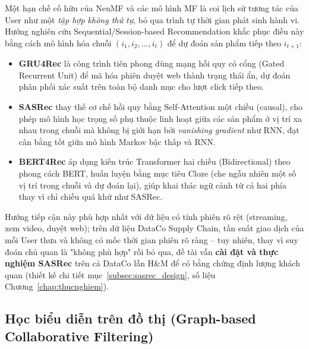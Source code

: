 Một hạn chế cố hữu của NeuMF và các mô hình MF là coi lịch sử tương tác của User như một \emph{tập hợp không thứ tự}, bỏ qua trình tự thời gian phát sinh hành vi. Hướng nghiên cứu Sequential/Session-based Recommendation khắc phục điều này bằng cách mô hình hóa chuỗi $(i_1, i_2, \dots, i_t)$ để dự đoán sản phẩm tiếp theo $i_{t+1}$:
\begin{itemize}
    \item \textbf{GRU4Rec} \parencite{hidasi2016gru4rec} là công trình tiên phong dùng mạng hồi quy có cổng (Gated Recurrent Unit) để mã hóa phiên duyệt web thành trạng thái ẩn, dự đoán phân phối xác suất trên toàn bộ danh mục cho lượt click tiếp theo.
    \item \textbf{SASRec} \parencite{kang2018self} thay thế cơ chế hồi quy bằng Self-Attention một chiều (causal), cho phép mô hình học trọng số phụ thuộc linh hoạt giữa các sản phẩm ở vị trí xa nhau trong chuỗi mà không bị giới hạn bởi \emph{vanishing gradient} như RNN, đạt cân bằng tốt giữa mô hình Markov bậc thấp và RNN.
    \item \textbf{BERT4Rec} \parencite{sun2019bert4rec} áp dụng kiến trúc Transformer hai chiều (Bidirectional) theo phong cách BERT, huấn luyện bằng mục tiêu Cloze (che ngẫu nhiên một số vị trí trong chuỗi và dự đoán lại), giúp khai thác ngữ cảnh từ cả hai phía thay vì chỉ chiều quá khứ như SASRec.
\end{itemize}
Hướng tiếp cận này phù hợp nhất với dữ liệu có tính phiên rõ rệt (streaming, xem video, duyệt web); trên dữ liệu DataCo Supply Chain, tần suất giao dịch của mỗi User thưa và không có mốc thời gian phiên rõ ràng -- tuy nhiên, thay vì suy đoán chủ quan là "không phù hợp" rồi bỏ qua, đề tài vẫn \textbf{cài đặt và thực nghiệm SASRec} trên cả DataCo lẫn H\&M để có bằng chứng định lượng khách quan (thiết kế chi tiết mục~\ref{subsec:sasrec_design}, số liệu Chương~\ref{chap:thucnghiem}).

\subsection{Học biểu diễn trên đồ thị (Graph-based Collaborative Filtering)}
\label{subsec:graph_cf}

